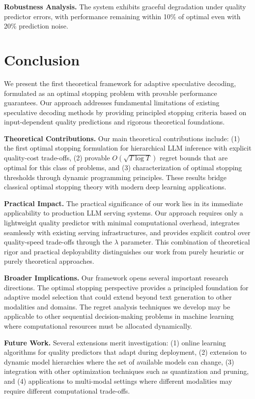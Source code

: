\documentclass{article}
\theoremstyle{plain}
\theoremstyle{definition}
\theoremstyle{remark}
\begin{document}
\textbf{Robustness Analysis.} The system exhibits graceful degradation under quality predictor errors, with performance remaining within 10\% of optimal even with 20\% prediction noise.


\section{Conclusion}
\label{sec:conclusion}
We present the first theoretical framework for adaptive speculative decoding, formulated as an optimal stopping problem with provable performance guarantees. Our approach addresses fundamental limitations of existing speculative decoding methods by providing principled stopping criteria based on input-dependent quality predictions and rigorous theoretical foundations.

\textbf{Theoretical Contributions.} Our main theoretical contributions include: (1) the first optimal stopping formulation for hierarchical LLM inference with explicit quality-cost trade-offs, (2) provable $O(\sqrt{T \log T})$ regret bounds that are optimal for this class of problems, and (3) characterization of optimal stopping thresholds through dynamic programming principles. These results bridge classical optimal stopping theory with modern deep learning applications.

\textbf{Practical Impact.} The practical significance of our work lies in its immediate applicability to production LLM serving systems. Our approach requires only a lightweight quality predictor with minimal computational overhead, integrates seamlessly with existing serving infrastructures, and provides explicit control over quality-speed trade-offs through the $\lambda$ parameter. This combination of theoretical rigor and practical deployability distinguishes our work from purely heuristic or purely theoretical approaches.

\textbf{Broader Implications.} Our framework opens several important research directions. The optimal stopping perspective provides a principled foundation for adaptive model selection that could extend beyond text generation to other modalities and domains. The regret analysis techniques we develop may be applicable to other sequential decision-making problems in machine learning where computational resources must be allocated dynamically.

\textbf{Future Work.} Several extensions merit investigation: (1) online learning algorithms for quality predictors that adapt during deployment, (2) extension to dynamic model hierarchies where the set of available models can change, (3) integration with other optimization techniques such as quantization and pruning, and (4) applications to multi-modal settings where different modalities may require different computational trade-offs.
\end{document}
